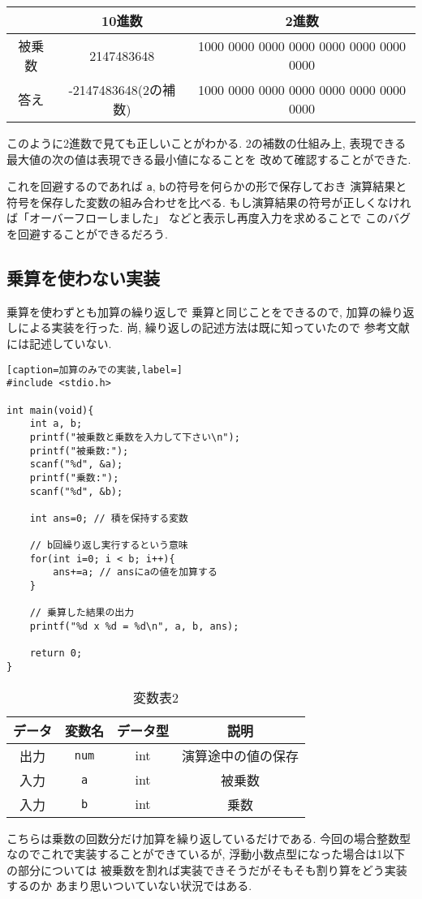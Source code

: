 \documentclass[a4paper, xelatex, ja=standard]{bxjsarticle}
\begin{document}
\begin{table}[h]
  \centering
  \caption{}
  \label{}
  \begin{tabular}{|c||c|c|}
  \hline
  & 10進数 & 2進数 \\ \hline
  被乗数 & 2147483648 & 1000 0000 0000 0000 0000 0000 0000 0000 \\ \hline
  答え & -2147483648(2の補数) & 1000 0000 0000 0000 0000 0000 0000 0000 \\ \hline
  \end{tabular}
\end{table}
このように2進数で見ても正しいことがわかる.
2の補数の仕組み上,
表現できる最大値の次の値は表現できる最小値になることを
改めて確認することができた.

これを回避するのであれば
\texttt{a}, \texttt{b}の符号を何らかの形で保存しておき
演算結果と符号を保存した変数の組み合わせを比べる.
もし演算結果の符号が正しくなければ「オーバーフローしました」
などと表示し再度入力を求めることで
このバグを回避することができるだろう.

\subsection{乗算を使わない実装}
乗算を使わずとも加算の繰り返しで
乗算と同じことをできるので,
加算の繰り返しによる実装を行った.
尚, 繰り返しの記述方法は既に知っていたので
参考文献には記述していない.
\begin{lstlisting}[caption=加算のみでの実装,label=]
#include <stdio.h>

int main(void){
	int a, b;
	printf("被乗数と乗数を入力して下さい\n");
	printf("被乗数:");
	scanf("%d", &a);
	printf("乗数:");
	scanf("%d", &b);

	int ans=0; // 積を保持する変数

	// b回繰り返し実行するという意味
	for(int i=0; i < b; i++){
		ans+=a; // ansにaの値を加算する
	}

	// 乗算した結果の出力
	printf("%d x %d = %d\n", a, b, ans);

	return 0;
}
\end{lstlisting}

\begin{table}[h]
\centering
\caption{変数表2}
\label{}
\begin{tabular}{|c|c|c|c|}
\hline
データ & 変数名 & データ型 & 説明  \\ \hline
出力 & \texttt{num} & int  & 演算途中の値の保存 \\ \hline
入力 & \texttt{a} & int  & 被乗数 \\ \hline
入力 & \texttt{b} & int  & 乗数  \\ \hline
\end{tabular}
\end{table}
こちらは乗数の回数分だけ加算を繰り返しているだけである.
今回の場合整数型なのでこれで実装することができているが,
浮動小数点型になった場合は1以下の部分については
被乗数を割れば実装できそうだがそもそも割り算をどう実装するのか
あまり思いついていない状況ではある.
\end{document}
